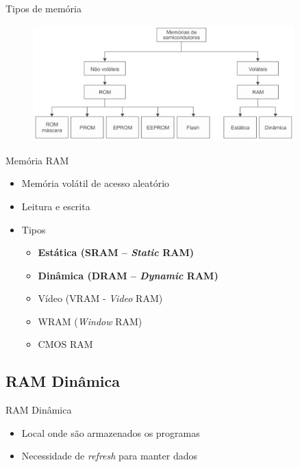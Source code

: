 \documentclass[aspectratio=169,
				xcolor=table]{beamer}
\begin{document}
	\begin{frame}{Tipos de memória}
		\begin{figure}[hbtp]
			\centering
			\includegraphics[width=0.9\textwidth, keepaspectratio]{../figs/cap07/semicond.png}
		\end{figure}
	\end{frame}
	
	\begin{frame}{Memória RAM}		
		\begin{itemize}
			\item Memória volátil de acesso aleatório
			\vspace{1em}
			\item Leitura e escrita
			\vspace{1em}
			\item Tipos
			\begin{itemize}
				\item \textbf{Estática (SRAM – \textit{Static} RAM)}
				\item \textbf{Dinâmica (DRAM – \textit{Dynamic} RAM)}
				\item Vídeo (VRAM - \textit{Video} RAM)
				\item WRAM (\textit{Window} RAM) 
				\item CMOS RAM
			\end{itemize}
		\end{itemize}		
	\end{frame}
	
	\subsection{RAM Dinâmica}
	\begin{frame}{RAM Dinâmica}
		\begin{itemize}
			\item Local onde são armazenados os programas
			\vspace{1em}
			\item Necessidade de \textit{refresh} para manter dados
		\end{itemize}
	\end{frame}
	
\end{document}
